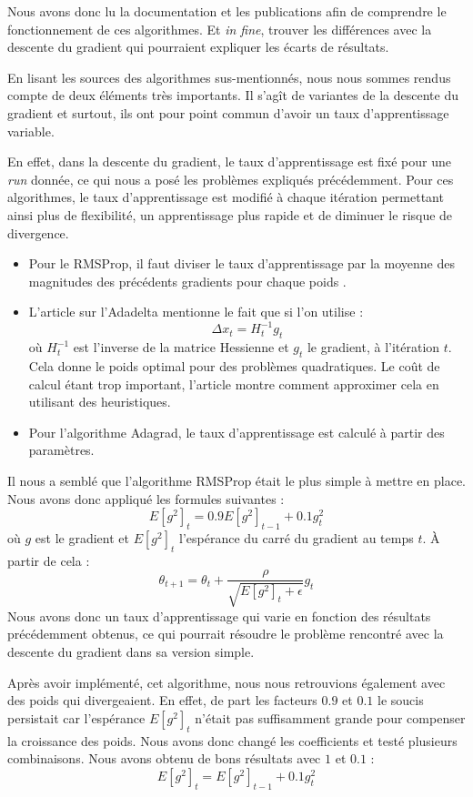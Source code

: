 \documentclass[a4paper, 11pt]{article}
\begin{document}
  Nous avons donc lu la documentation et les publications afin de comprendre le fonctionnement de ces algorithmes. Et \textit{in fine}, trouver les 
  différences avec la descente du gradient qui pourraient expliquer les écarts de résultats.
  
  En lisant les sources des algorithmes sus-mentionnés, nous nous sommes rendus compte de deux éléments très importants. Il s'agît de variantes de la
  descente du gradient et surtout, ils ont pour point commun d'avoir un taux d'apprentissage variable.
  
  En effet, dans la descente du gradient, le taux d'apprentissage est fixé pour une \textit{run} donnée, ce qui nous a posé les problèmes expliqués précédemment.
  Pour ces algorithmes, le taux d'apprentissage est modifié à chaque itération permettant ainsi plus de flexibilité, un apprentissage plus 
  rapide et de diminuer le risque de divergence.
  \begin{itemize}
   \item Pour le RMSProp, il faut diviser le taux d'apprentissage par la moyenne des magnitudes des précédents gradients pour chaque poids \cite{rmsprop}.
   \item L'article sur l'Adadelta mentionne le fait que si l'on utilise \cite{adadelta}:
   $$\Delta x_t = H_t^{-1}g_t$$
   où $H_t^{-1}$ est l'inverse de la matrice Hessienne et $g_t$ le gradient, à l'itération $t$. Cela donne le poids optimal pour des problèmes quadratiques.
   Le coût de calcul étant trop important, l'article montre comment approximer cela en utilisant des heuristiques.
   \item Pour l'algorithme Adagrad, le taux d'apprentissage est calculé à partir des paramètres.
  \end{itemize}

  Il nous a semblé que l'algorithme RMSProp était le plus simple à mettre en place. Nous avons donc appliqué les formules suivantes \cite{rmsprop_algo} :
  $$E[g^2]_t = 0.9 E[g^2]_{t-1} + 0.1 g^2_t$$
  où $g$ est le gradient et $E[g^2]_t$ l'espérance du carré du gradient au temps $t$. À partir de cela :
  $$\theta_{t+1} = \theta_t + \frac{\rho}{\sqrt{E[g^2]_t + \epsilon}} g_t$$
  Nous avons donc un taux d'apprentissage qui varie en fonction des résultats précédemment obtenus, ce qui pourrait résoudre le problème rencontré avec la
  descente du gradient dans sa version simple.
  
  Après avoir implémenté, cet algorithme, nous nous retrouvions également avec des poids qui divergeaient. En effet, de part les facteurs $0.9$ et $0.1$ 
  le soucis persistait car l'espérance $E[g^2]_t$ n'était pas suffisamment grande pour compenser la croissance des poids. Nous avons donc changé les 
  coefficients et testé plusieurs combinaisons. Nous avons obtenu de bons résultats avec $1$ et $0.1$ :
  $$E[g^2]_t = E[g^2]_{t-1} + 0.1 g^2_t$$
  
\end{document}
